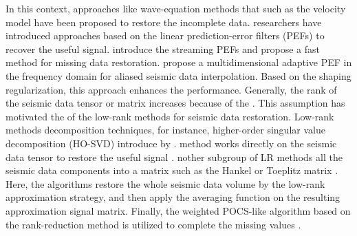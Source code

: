 In this context, approaches like wave-equation methods \citep{ronen1987wave,fomel2003seismic} that  such as the velocity model have been proposed to restore the incomplete data.  researchers \citep{spitz1991seismic,porsani1999seismic,crawley2000seismic,curry2003interpolation,liu2015adaptive,fomel2016streaming,wanghang2021geo} have introduced approaches based on the linear prediction-error filters (PEFs) to recover the useful signal. \cite{fomel2016streaming} introduce the streaming PEFs and propose a fast method for missing data restoration. \cite{li2017multidimensional} propose a multidimensional adaptive PEF in the frequency domain for aliased seismic data interpolation. Based on the shaping regularization, this approach enhances the  performance. Generally, the rank of the seismic data tensor or matrix increases because of the . This assumption has motivated the  of the low-rank methods for seismic data restoration. Low-rank  methods  decomposition techniques, for instance, higher-order singular value decomposition (HO-SVD) introduce by \cite{de2000multilinear}.  method works directly on the seismic data tensor to restore the useful signal \citep{kreimer2012tensor,kreimer2013tensor,ely20155d,carozzi2019robust}. nother subgroup of LR methods   all the seismic data components into a matrix such as the Hankel or Toeplitz matrix \citep{gao2013fast,siahsar2017simultaneous,zhang2017hybrid,oboue2020robust}. Here, the algorithms restore the whole seismic data volume by the low-rank approximation strategy, and then apply the averaging function \citep{chen2016open} on the resulting approximation signal matrix. Finally, the weighted POCS-like algorithm based on the rank-reduction method is utilized to complete the missing values . 
